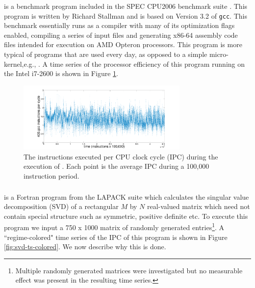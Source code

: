 \gcc is a benchmark program included in the SPEC CPU2006 benchmark suite \cite{spec}. This program is written by Richard Stallman and is based on Version 3.2 of {\tt gcc}. This benchmark essentially runs as a compiler with many of its optimization flags enabled, compiling a series of input files and generating x86-64 assembly code files intended for execution on AMD Opteron processors\cite{spec}. This program is more typical of programs that are used every day, as opposed to a simple micro-kernel,e.g., \col. A time series of the processor efficiency of this program running on the Intel i7-2600 is shown in Figure \ref{fig:gcc-ts}.

  \begin{figure}[t]
  \centering
    \includegraphics[width=0.75\textwidth]{figs/gccfullts}
    \caption{The instructions executed per CPU clock cycle (IPC) during the execution of \gcc. Each point is the average IPC during a 100,000 instruction period.}
    \label{fig:gcc-ts}
  \end{figure}

\subsubsection{}

\svd is a Fortran program from the LAPACK suite \cite{lapack} which calculates the singular value decomposition (SVD) of a rectangular $M$ by $N$  real-valued matrix which need not contain special structure such as symmetric, positive definite etc. To execute this program we input a 750 x 1000 matrix of randomly generated entries\footnote{Multiple randomly generated matrices were investigated but no measurable effect was present in the resulting time series.}. A ``regime-colored" time series of the IPC of this program is shown in Figure \ref{fig:svd-ts-colored}. We now describe why this is done.

